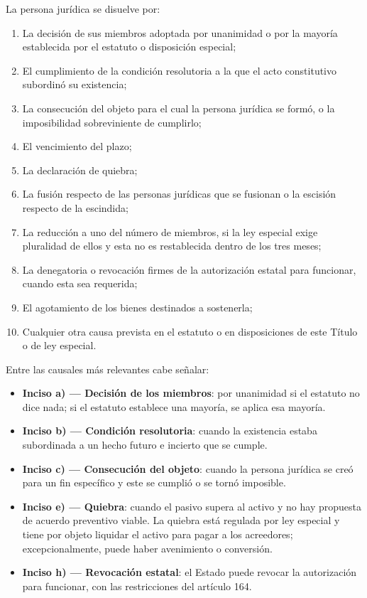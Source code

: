 \documentclass[12pt,oneside]{book}
\begin{document}
\begin{regla}
La persona jurídica se disuelve por:
\begin{enumerate}[label=\alph*)]
    \item La decisión de sus miembros adoptada por unanimidad o por la mayoría establecida por el estatuto o disposición especial;
    \item El cumplimiento de la condición resolutoria a la que el acto constitutivo subordinó su existencia;
    \item La consecución del objeto para el cual la persona jurídica se formó, o la imposibilidad sobreviniente de cumplirlo;
    \item El vencimiento del plazo;
    \item La declaración de quiebra;
    \item La fusión respecto de las personas jurídicas que se fusionan o la escisión respecto de la escindida;
    \item La reducción a uno del número de miembros, si la ley especial exige pluralidad de ellos y esta no es restablecida dentro de los tres meses;
    \item La denegatoria o revocación firmes de la autorización estatal para funcionar, cuando esta sea requerida;
    \item El agotamiento de los bienes destinados a sostenerla;
    \item Cualquier otra causa prevista en el estatuto o en disposiciones de este Título o de ley especial.
\end{enumerate}
\end{regla}

Entre las causales más relevantes cabe señalar:

\begin{itemize}
    \item \textbf{Inciso a) --- Decisión de los miembros}: por unanimidad si el estatuto no dice nada; si el estatuto establece una mayoría, se aplica esa mayoría.
    \item \textbf{Inciso b) --- Condición resolutoria}: cuando la existencia estaba subordinada a un hecho futuro e incierto que se cumple.
    \item \textbf{Inciso c) --- Consecución del objeto}: cuando la persona jurídica se creó para un fin específico y este se cumplió o se tornó imposible.
    \item \textbf{Inciso e) --- Quiebra}: cuando el pasivo supera al activo y no hay propuesta de acuerdo preventivo viable. La quiebra está regulada por ley especial y tiene por objeto liquidar el activo para pagar a los acreedores; excepcionalmente, puede haber avenimiento o conversión.
    \item \textbf{Inciso h) --- Revocación estatal}: el Estado puede revocar la autorización para funcionar, con las restricciones del artículo 164.
\end{itemize}
\end{document}
